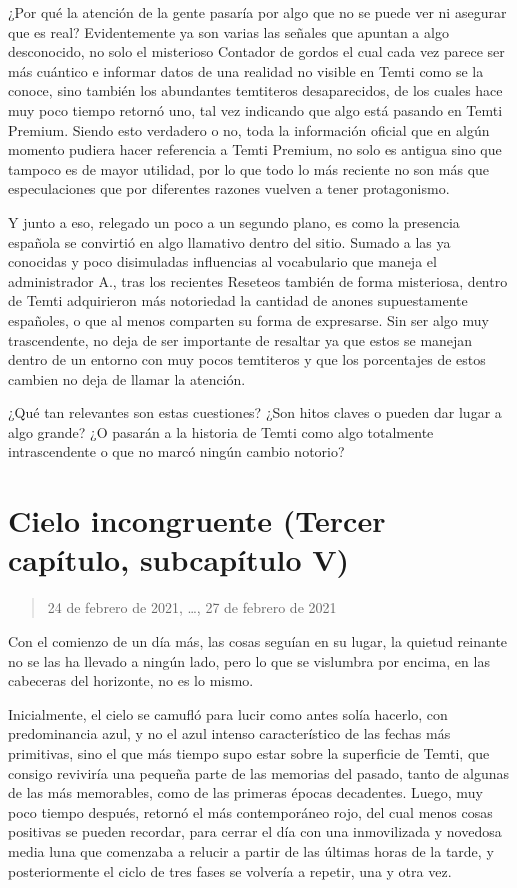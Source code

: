 \documentclass[
  spanish,
]{book}
\begin{document}
¿Por qué la atención de la gente pasaría por algo que no se puede ver ni asegurar que es real?
Evidentemente ya son varias las señales que apuntan a algo desconocido, no solo el misterioso Contador de gordos el cual cada vez parece ser más cuántico e informar datos de una realidad no visible en Temti como se la conoce, sino también los abundantes temtiteros desaparecidos, de los cuales hace muy poco tiempo retornó uno, tal vez indicando que algo está pasando en Temti Premium. Siendo esto verdadero o no, toda la información oficial que en algún momento pudiera hacer referencia a Temti Premium, no solo es antigua sino que tampoco es de mayor utilidad, por lo que todo lo más reciente no son más que especulaciones que por diferentes razones vuelven a tener protagonismo.

Y junto a eso, relegado un poco a un segundo plano, es como la presencia española se convirtió en algo llamativo dentro del sitio. Sumado a las ya conocidas y poco disimuladas influencias al vocabulario que maneja el administrador A., tras los recientes Reseteos también de forma misteriosa, dentro de Temti adquirieron más notoriedad la cantidad de anones supuestamente españoles, o que al menos comparten su forma de expresarse. Sin ser algo muy trascendente, no deja de ser importante de resaltar ya que estos se manejan dentro de un entorno con muy pocos temtiteros y que los porcentajes de estos cambien no deja de llamar la atención.

¿Qué tan relevantes son estas cuestiones? ¿Son hitos claves o pueden dar lugar a algo grande? ¿O pasarán a la historia de Temti como algo totalmente intrascendente o que no marcó ningún cambio notorio?

\hypertarget{cielo-incongruente-tercer-capuxedtulo-subcapuxedtulo-v}{%
\section{Cielo incongruente (Tercer capítulo, subcapítulo V)}\label{cielo-incongruente-tercer-capuxedtulo-subcapuxedtulo-v}}

\begin{quote}
24 de febrero de 2021, \ldots, 27 de febrero de 2021
\end{quote}

Con el comienzo de un día más, las cosas seguían en su lugar, la quietud reinante no se las ha llevado a ningún lado, pero lo que se vislumbra por encima, en las cabeceras del horizonte, no es lo mismo.

Inicialmente, el cielo se camufló para lucir como antes solía hacerlo, con predominancia azul, y no el azul intenso característico de las fechas más primitivas, sino el que más tiempo supo estar sobre la superficie de Temti, que consigo reviviría una pequeña parte de las memorias del pasado, tanto de algunas de las más memorables, como de las primeras épocas decadentes.
Luego, muy poco tiempo después, retornó el más contemporáneo rojo, del cual menos cosas positivas se pueden recordar, para cerrar el día con una inmovilizada y novedosa media luna que comenzaba a relucir a partir de las últimas horas de la tarde, y posteriormente el ciclo de tres fases se volvería a repetir, una y otra vez.
\end{document}
